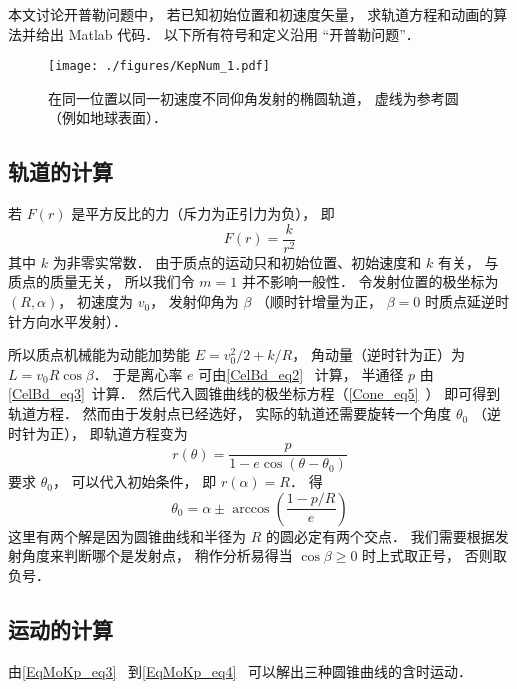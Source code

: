 
\begin{issues}
\end{issues}


本文讨论开普勒问题中， 若已知初始位置和初速度矢量， 求轨道方程和动画的算法并给出 Matlab 代码． 以下所有符号和定义沿用 “开普勒问题”．
\begin{figure}[ht]
\centering
\texttt{[image: ./figures/KepNum\_1.pdf]}
\caption{在同一位置以同一初速度不同仰角发射的椭圆轨道， 虚线为参考圆（例如地球表面）．} \label{KepNum_fig1}
\end{figure}

\subsection{轨道的计算}
若 $F(r)$ 是平方反比的力（斥力为正引力为负）， 即
\begin{equation}
F(r) = \frac{k}{r^2}
\end{equation}
其中 $k$ 为非零实常数． 由于质点的运动只和初始位置、初始速度和 $k$ 有关， 与质点的质量无关， 所以我们令 $m=1$ 并不影响一般性． 令发射位置的极坐标为 $(R,\alpha)$， 初速度为 $v_0$， 发射仰角为 $\beta$ （顺时针增量为正， $\beta=0$ 时质点延逆时针方向水平发射）．

所以质点机械能为动能加势能 $E = v_0^2/2 + k/R$， 角动量（逆时针为正）为 $L = v_0 R\cos\beta$． 于是离心率 $e$ 可由\autoref{CelBd_eq2}~ 计算， 半通径 $p$ 由\autoref{CelBd_eq3}~计算． 然后代入圆锥曲线的极坐标方程（\autoref{Cone_eq5}~） 即可得到轨道方程． 然而由于发射点已经选好， 实际的轨道还需要旋转一个角度 $\theta_0$ （逆时针为正）， 即轨道方程变为
\begin{equation}\label{KepNum_eq1}
r(\theta)  = \frac{p}{1 - e\cos (\theta-\theta_0)}
\end{equation}
要求 $\theta_0$， 可以代入初始条件， 即 $r(\alpha) = R$． 得
\begin{equation}
\theta_0 = \alpha \pm \arccos(\frac{1-p/R}{e})
\end{equation}
这里有两个解是因为圆锥曲线和半径为 $R$ 的圆必定有两个交点． 我们需要根据发射角度来判断哪个是发射点， 稍作分析易得当 $\cos\beta \geqslant 0$ 时上式取正号， 否则取负号．

\subsection{运动的计算}
由\autoref{EqMoKp_eq3}~ 到\autoref{EqMoKp_eq4}~ 可以解出三种圆锥曲线的含时运动．

